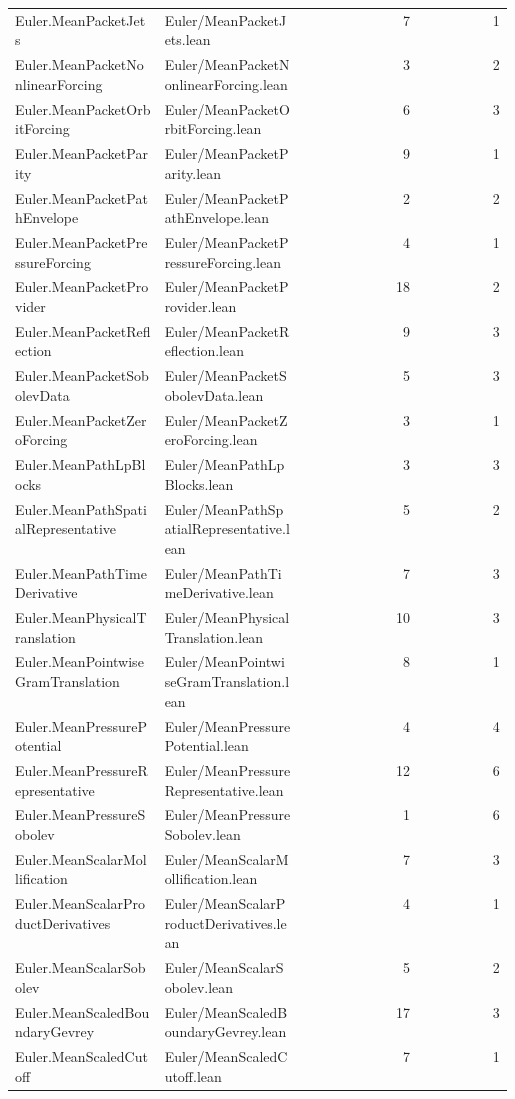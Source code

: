 \begin{longtable}{p{0.30\linewidth}p{0.28\linewidth}rr}
Euler.MeanPacketJets & Euler/MeanPacketJets.lean & 7 & 1\\
Euler.MeanPacketNonlinearForcing & Euler/MeanPacketNonlinearForcing.lean & 3 & 2\\
Euler.MeanPacketOrbitForcing & Euler/MeanPacketOrbitForcing.lean & 6 & 3\\
Euler.MeanPacketParity & Euler/MeanPacketParity.lean & 9 & 1\\
Euler.MeanPacketPathEnvelope & Euler/MeanPacketPathEnvelope.lean & 2 & 2\\
Euler.MeanPacketPressureForcing & Euler/MeanPacketPressureForcing.lean & 4 & 1\\
Euler.MeanPacketProvider & Euler/MeanPacketProvider.lean & 18 & 2\\
Euler.MeanPacketReflection & Euler/MeanPacketReflection.lean & 9 & 3\\
Euler.MeanPacketSobolevData & Euler/MeanPacketSobolevData.lean & 5 & 3\\
Euler.MeanPacketZeroForcing & Euler/MeanPacketZeroForcing.lean & 3 & 1\\
Euler.MeanPathLpBlocks & Euler/MeanPathLpBlocks.lean & 3 & 3\\
Euler.MeanPathSpatialRepresentative & Euler/MeanPathSpatialRepresentative.lean & 5 & 2\\
Euler.MeanPathTimeDerivative & Euler/MeanPathTimeDerivative.lean & 7 & 3\\
Euler.MeanPhysicalTranslation & Euler/MeanPhysicalTranslation.lean & 10 & 3\\
Euler.MeanPointwiseGramTranslation & Euler/MeanPointwiseGramTranslation.lean & 8 & 1\\
Euler.MeanPressurePotential & Euler/MeanPressurePotential.lean & 4 & 4\\
Euler.MeanPressureRepresentative & Euler/MeanPressureRepresentative.lean & 12 & 6\\
Euler.MeanPressureSobolev & Euler/MeanPressureSobolev.lean & 1 & 6\\
Euler.MeanScalarMollification & Euler/MeanScalarMollification.lean & 7 & 3\\
Euler.MeanScalarProductDerivatives & Euler/MeanScalarProductDerivatives.lean & 4 & 1\\
Euler.MeanScalarSobolev & Euler/MeanScalarSobolev.lean & 5 & 2\\
Euler.MeanScaledBoundaryGevrey & Euler/MeanScaledBoundaryGevrey.lean & 17 & 3\\
Euler.MeanScaledCutoff & Euler/MeanScaledCutoff.lean & 7 & 1\\

\end{longtable}
